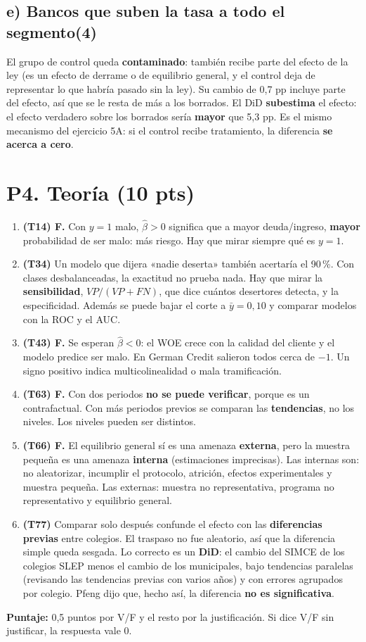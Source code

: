 \documentclass[11pt,a4paper]{article}
\newcommand{\sub}[2]{\subsection*{#1\hfill{\normalsize\textbf{(#2)}}}}
\begin{document}
\sub{e) Bancos que suben la tasa a todo el segmento}{4}
\begin{ejemplar}
El grupo de control queda \textbf{contaminado}: también recibe parte del efecto de la ley (es un efecto de derrame o de equilibrio general, y el control deja de representar lo que habría pasado sin la ley). Su cambio de 0,7 pp incluye parte del efecto, así que se le resta de más a los borrados. El DiD \textbf{subestima} el efecto: el efecto verdadero sobre los borrados sería \textbf{mayor} que 5,3 pp. Es el mismo mecanismo del ejercicio 5A: si el control recibe tratamiento, la diferencia \textbf{se acerca a cero}.
\end{ejemplar}

\section*{P4. Teoría (10 pts)}
\small
\begin{enumerate}[label=\arabic*.,leftmargin=*,itemsep=3pt]
\item \textbf{(T14) F.} Con $y=1$ malo, $\hat\beta>0$ significa que a mayor deuda/ingreso, \textbf{mayor} probabilidad de ser malo: más riesgo. Hay que mirar siempre qué es $y=1$.
\item \textbf{(T34)} Un modelo que dijera «nadie deserta» también acertaría el 90\,\%. Con clases desbalanceadas, la exactitud no prueba nada. Hay que mirar la \textbf{sensibilidad}, $VP/(VP+FN)$, que dice cuántos desertores detecta, y la especificidad. Además se puede bajar el corte a $\bar y=0{,}10$ y comparar modelos con la ROC y el AUC.
\item \textbf{(T43) F.} Se esperan $\hat\beta<0$: el WOE crece con la calidad del cliente y el modelo predice ser malo. En German Credit salieron todos cerca de $-1$. Un signo positivo indica multicolinealidad o mala tramificación.
\item \textbf{(T63) F.} Con dos periodos \textbf{no se puede verificar}, porque es un contrafactual. Con más periodos previos se comparan las \textbf{tendencias}, no los niveles. Los niveles pueden ser distintos.
\item \textbf{(T66) F.} El equilibrio general sí es una amenaza \textbf{externa}, pero la muestra pequeña es una amenaza \textbf{interna} (estimaciones imprecisas). Las internas son: no aleatorizar, incumplir el protocolo, atrición, efectos experimentales y muestra pequeña. Las externas: muestra no representativa, programa no representativo y equilibrio general.
\item \textbf{(T77)} Comparar solo después confunde el efecto con las \textbf{diferencias previas} entre colegios. El traspaso no fue aleatorio, así que la diferencia simple queda sesgada. Lo correcto es un \textbf{DiD}: el cambio del SIMCE de los colegios SLEP menos el cambio de los municipales, bajo tendencias paralelas (revisando las tendencias previas con varios años) y con errores agrupados por colegio. Pfeng dijo que, hecho así, la diferencia \textbf{no es significativa}.
\end{enumerate}
\normalsize
\textbf{Puntaje:} 0,5 puntos por V/F y el resto por la justificación. Si dice V/F sin justificar, la respuesta vale 0.
\end{document}

